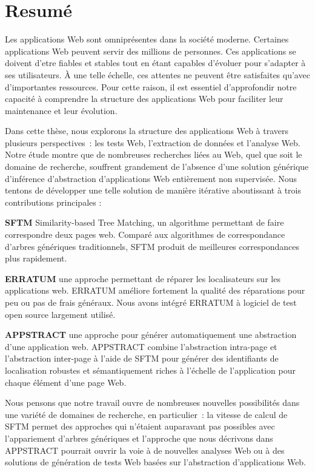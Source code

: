 \thispagestyle{empty}
\section*{Resumé}

\begin{doublespace}
Les applications Web sont omniprésentes dans la société moderne.
Certaines applications Web peuvent servir des millions de personnes.
Ces applications se doivent d'etre fiables et stables tout en étant capables d'évoluer pour s'adapter à ses utilisateurs.
À une telle échelle, ces attentes ne peuvent être satisfaites qu'avec d'importantes ressources.
Pour cette raison, il est essentiel d'approfondir notre capacité à comprendre la structure des applications Web pour faciliter leur maintenance et leur évolution.

Dans cette thèse, nous explorons la structure des applications Web à travers plusieurs perspectives : les tests Web, l'extraction de données et l'analyse Web.
Notre étude montre que de nombreuses recherches liées au Web, quel que soit le domaine de recherche, souffrent grandement de l'absence d'une solution générique d'inférence d'abstraction d'applications Web entièrement non supervisée. Nous tentons de développer une telle solution de manière itérative aboutissant à trois contributions principales :

\textbf{SFTM} Similarity-based Tree Matching, un algorithme permettant de faire correspondre deux pages web. Comparé aux algorithmes de correspondance d'arbres génériques traditionnels, SFTM produit de meilleures correspondances plus rapidement.

\textbf{ERRATUM} une approche permettant de réparer les localisateurs sur les applications web. ERRATUM améliore fortement la qualité des réparations pour peu ou pas de frais généraux. Nous avons intégré ERRATUM à logiciel de test open source largement utilisé.

\textbf{APPSTRACT} une approche pour générer automatiquement une abstraction d'une application web. APPSTRACT combine l'abstraction intra-page et l'abstraction inter-page à l'aide de SFTM pour générer des identifiants de localisation robustes et sémantiquement riches à l'échelle de l'application pour chaque élément d'une page Web.

Nous pensons que notre travail ouvre de nombreuses nouvelles possibilités dans une variété de domaines de recherche, en particulier : la vitesse de calcul de SFTM permet des approches qui n'étaient auparavant pas possibles avec l'appariement d'arbres génériques et l'approche que nous décrivons dans APPSTRACT pourrait ouvrir la voie à de nouvelles analyses Web ou à des solutions de génération de tests Web basées sur l'abstraction d'applications Web.
\end{doublespace}

